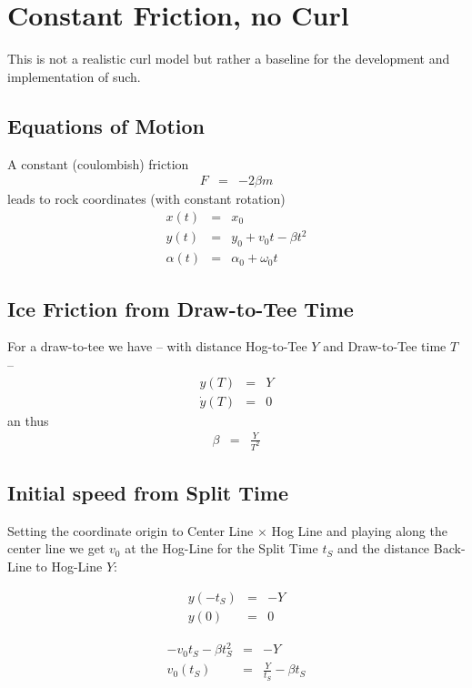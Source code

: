\section{Constant Friction, no Curl} This is not a realistic curl model but 
rather a baseline for the development and implementation of such.

\subsection{Equations of Motion}
A constant (coulombish) friction
\begin{eqnarray}
F &=& -2 \beta m
\end{eqnarray}
leads to rock coordinates (with constant rotation)
\begin{eqnarray}
x(t) &=& x_0 \\
y(t) &=& y_0 + v_0 t - \beta t^2 \\
\alpha(t) &=& \alpha_0 + \omega_0 t
\end{eqnarray}

\subsection{Ice Friction from Draw-to-Tee Time}
For a draw-to-tee we have -- with distance Hog-to-Tee $Y$ and Draw-to-Tee time 
$T$ --
\begin{eqnarray}
y(T) &=& Y \\
\dot y(T) &=& 0
\end{eqnarray}
an thus
\begin{eqnarray}
\beta &=& \frac{Y}{T^2}
\end{eqnarray}

\subsection{Initial speed from Split Time}
Setting the coordinate origin to Center Line $\times$ Hog Line and playing 
along the center line we get $v_0$ at the Hog-Line for the Split Time $t_S$ and 
the distance Back-Line to Hog-Line $Y$:

\begin{eqnarray}
y(-t_S) &=& -Y \\
y(0) &=& 0
\end{eqnarray}

\begin{eqnarray}
-v_0 t_S - \beta t_S^2 &=& -Y \\
v_0(t_S) &=& \frac{Y}{t_S} - \beta t_S
\end{eqnarray}
